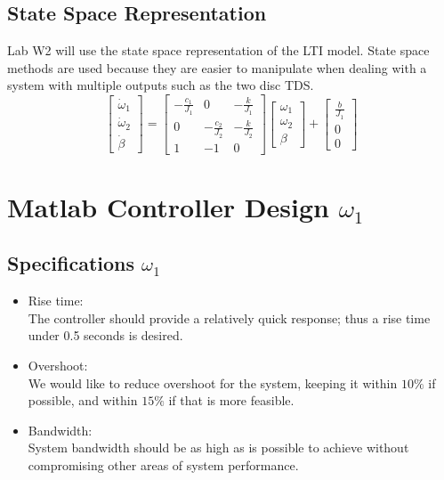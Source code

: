 \documentclass[11pt,titlepage]{article}
\begin{document}
	\subsection{State Space Representation}
		Lab W2 will use the state space representation of the LTI model. State space methods are used because they are easier to manipulate when dealing with a system with multiple outputs such as the two disc TDS.
		\begin{equation}
			\begin{bmatrix}
				\dot \omega_1\\
				\dot \omega_2\\
				\dot \beta
			\end{bmatrix}=
	  		\begin{bmatrix}
	    		-\frac{c_1}{J_1} & 0 & -\frac{k}{J_1} \\
		    	0 & -\frac{c_2}{J_2} & -\frac{k}{J_2}\\
				1 & -1 & 0
	  		\end{bmatrix}
			\begin{bmatrix}
				\omega_1\\
				\omega_2\\
				\beta
			\end{bmatrix}+
			\begin{bmatrix}
				\frac{b}{J_1}\\
				0\\
				0
			\end{bmatrix}
		\end{equation}

\section{Matlab Controller Design $\omega_1$}
	
	\subsection{Specifications $\omega_1$}
		\begin{itemize}
			\item Rise time:\\
			The controller should provide a relatively quick response; thus a rise time under 0.5 seconds is desired. 
			\item Overshoot:\\
			We would like to reduce overshoot for the system, keeping it within $10\%$ if possible, and within $15\%$ if that is more feasible.
			\item Bandwidth:\\
			System bandwidth should be as high as is possible to achieve without compromising other areas of system performance.
		\end{itemize}
		
\end{document}
